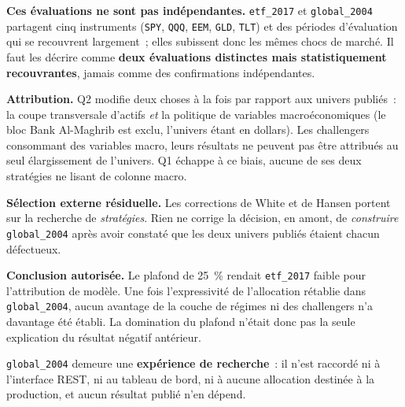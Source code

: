 \textbf{Ces évaluations ne sont pas indépendantes.} \texttt{etf\_2017} et
\texttt{global\_2004} partagent cinq instruments (\texttt{SPY}, \texttt{QQQ},
\texttt{EEM}, \texttt{GLD}, \texttt{TLT}) et des périodes d'évaluation qui se
recouvrent largement~; elles subissent donc les mêmes chocs de marché. Il faut
les décrire comme \textbf{deux évaluations distinctes mais statistiquement
recouvrantes}, jamais comme des confirmations indépendantes.

\textbf{Attribution.} Q2 modifie deux choses à la fois par rapport aux univers
publiés~: la coupe transversale d'actifs \emph{et} la politique de variables
macroéconomiques (le bloc Bank Al-Maghrib est exclu, l'univers étant en
dollars). Les challengers consommant des variables macro, leurs résultats ne
peuvent pas être attribués au seul élargissement de l'univers. Q1 échappe à ce
biais, aucune de ses deux stratégies ne lisant de colonne macro.

\textbf{Sélection externe résiduelle.} Les corrections de White et de Hansen
portent sur la recherche de \emph{stratégies}. Rien ne corrige la décision, en
amont, de \emph{construire} \texttt{global\_2004} après avoir constaté que les
deux univers publiés étaient chacun défectueux.

\begin{remarquebox}
\textbf{Conclusion autorisée.} Le plafond de 25~\% rendait \texttt{etf\_2017}
faible pour l'attribution de modèle. Une fois l'expressivité de l'allocation
rétablie dans \texttt{global\_2004}, aucun avantage de la couche de régimes ni
des challengers n'a davantage été établi. La domination du plafond n'était donc
pas la seule explication du résultat négatif antérieur.
\end{remarquebox}

\texttt{global\_2004} demeure une \textbf{expérience de recherche}~: il n'est
raccordé ni à l'interface REST, ni au tableau de bord, ni à aucune allocation
destinée à la production, et aucun résultat publié n'en dépend.
